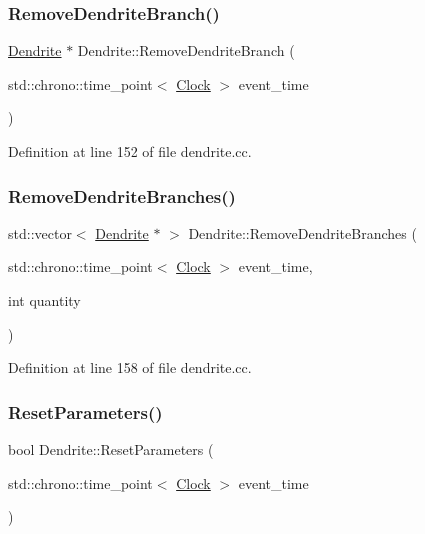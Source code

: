 \subsubsection{\texorpdfstring{Remove\+Dendrite\+Branch()}{RemoveDendriteBranch()}}
{\footnotesize\ttfamily \mbox{\hyperlink{class_dendrite}{Dendrite}} $\ast$ Dendrite\+::\+Remove\+Dendrite\+Branch (\begin{DoxyParamCaption}\item[{std\+::chrono\+::time\+\_\+point$<$ \mbox{\hyperlink{universe_8h_a0ef8d951d1ca5ab3cfaf7ab4c7a6fd80}{Clock}} $>$}]{event\+\_\+time }\end{DoxyParamCaption})}



Definition at line 152 of file dendrite.\+cc.

\mbox{\label{class_dendrite_a15396dce5e1d920fcd1477b9a255dabf}} 
\subsubsection{\texorpdfstring{Remove\+Dendrite\+Branches()}{RemoveDendriteBranches()}}
{\footnotesize\ttfamily std\+::vector$<$ \mbox{\hyperlink{class_dendrite}{Dendrite}} $\ast$ $>$ Dendrite\+::\+Remove\+Dendrite\+Branches (\begin{DoxyParamCaption}\item[{std\+::chrono\+::time\+\_\+point$<$ \mbox{\hyperlink{universe_8h_a0ef8d951d1ca5ab3cfaf7ab4c7a6fd80}{Clock}} $>$}]{event\+\_\+time,  }\item[{int}]{quantity }\end{DoxyParamCaption})}



Definition at line 158 of file dendrite.\+cc.

\mbox{\label{class_dendrite_a6a6290955348051819badb801b753901}} 
\subsubsection{\texorpdfstring{Reset\+Parameters()}{ResetParameters()}}
{\footnotesize\ttfamily bool Dendrite\+::\+Reset\+Parameters (\begin{DoxyParamCaption}\item[{std\+::chrono\+::time\+\_\+point$<$ \mbox{\hyperlink{universe_8h_a0ef8d951d1ca5ab3cfaf7ab4c7a6fd80}{Clock}} $>$}]{event\+\_\+time }\end{DoxyParamCaption})}



